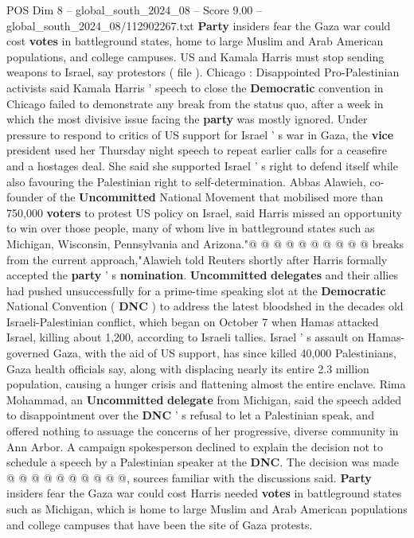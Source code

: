 \begin{textsample}{POS Dim 8 – global\_south\_2024\_08 – Score 9.00 – global\_south\_2024\_08/112902267.txt}  \label{ex:f8_pos_178}
\textbf{Party} insiders fear the Gaza war could cost \textbf{votes} in battleground states, home to large Muslim and Arab American populations, and college campuses.
US and Kamala Harris must stop sending weapons to Israel, say protestors ( file ).
Chicago : Disappointed Pro-Palestinian activists said Kamala Harris ' speech to close the \textbf{Democratic} convention in Chicago failed to demonstrate any break from the status quo, after a week in which the most divisive issue facing the \textbf{party} was mostly ignored.
Under pressure to respond to critics of US support for Israel ' s war in Gaza, the \textbf{vice} president used her Thursday night speech to repeat earlier calls for a ceasefire and a hostages deal.
She said she supported Israel ' s right to defend itself while also favouring the Palestinian right to self-determination.
Abbas Alawieh, co-founder of the \textbf{Uncommitted} National Movement that mobilised more than 750,000 \textbf{voters} to protest US policy on Israel, said Harris missed an opportunity to win over those people, many of whom live in battleground states such as Michigan, Wisconsin, Pennsylvania and Arizona."@ @ @ @ @ @ @ @ @ @ breaks from the current approach,"Alawieh told Reuters shortly after Harris formally accepted the \textbf{party} ' s \textbf{nomination}. \textbf{Uncommitted} \textbf{delegates} and their allies had pushed unsuccessfully for a prime-time speaking slot at the \textbf{Democratic} National Convention ( \textbf{DNC} ) to address the latest bloodshed in the decades old Israeli-Palestinian conflict, which began on October 7 when Hamas attacked Israel, killing about 1,200, according to Israeli tallies.
Israel ' s assault on Hamas-governed Gaza, with the aid of US support, has since killed 40,000 Palestinians, Gaza health officials say, along with displacing nearly its entire 2.3 million population, causing a hunger crisis and flattening almost the entire enclave.
Rima Mohammad, an \textbf{Uncommitted} \textbf{delegate} from Michigan, said the speech added to disappointment over the \textbf{DNC} ' s refusal to let a Palestinian speak, and offered nothing to assuage the concerns of her progressive, diverse community in Ann Arbor.
A campaign spokesperson declined to explain the decision not to schedule a speech by a Palestinian speaker at the \textbf{DNC}.
The decision was made @ @ @ @ @ @ @ @ @ @, sources familiar with the discussions said. \textbf{Party} insiders fear the Gaza war could cost Harris needed \textbf{votes} in battleground states such as Michigan, which is home to large Muslim and Arab American populations and college campuses that have been the site of Gaza protests.

\end{textsample}
